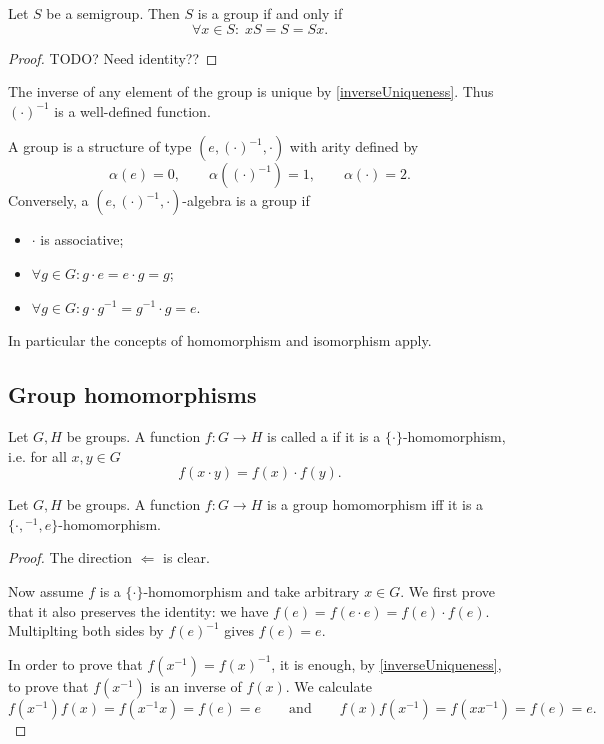 \begin{lemma}
Let $S$ be a semigroup. Then $S$ is a group \textup{if and only if}
\[ \forall x\in S: \; xS = S = Sx. \]
\end{lemma}
\begin{proof}
TODO? Need identity??
\end{proof}

The inverse of any element of the group is unique by \ref{inverseUniqueness}. Thus $(\cdot)^{-1}$ is a well-defined function.

\begin{proposition}
A group is a structure of type $(e, (\cdot)^{-1}, \boldsymbol{\cdot})$ with arity defined by
\[ \alpha(e) = 0, \qquad \alpha((\cdot)^{-1}) = 1, \qquad \alpha(\boldsymbol{\cdot}) = 2. \]
Conversely, a $(e, (\cdot)^{-1}, \boldsymbol{\cdot})$-algebra is a group if
\begin{itemize}
\item $\boldsymbol{\cdot}$ is associative;
\item $\forall g\in G: g\cdot e = e\cdot g = g$;
\item $\forall g\in G: g\cdot g^{-1} = g^{-1}\cdot g = e$.
\end{itemize}
\end{proposition}
In particular the concepts of homomorphism and isomorphism apply.

\subsection{Group homomorphisms}
\begin{definition}
Let $G,H$ be groups. A function $f: G\to H$ is called a  if it is a $\{\cdot\}$-homomorphism, i.e. for all $x,y\in G$
\[ f(x\cdot y) = f(x)\cdot f(y). \]
\end{definition}

\begin{lemma} \label{groupHomomorphismPreservesSignature}
Let $G,H$ be groups. A function $f: G\to H$ is a group homomorphism iff it is a $\{\cdot, {}^{-1}, e\}$-homomorphism.
\end{lemma}
\begin{proof}
The direction $\Leftarrow$ is clear.

Now assume $f$ is a $\{\cdot\}$-homomorphism and take arbitrary $x\in G$. We first prove that it also preserves the identity: we have $f(e) = f(e\cdot e) = f(e)\cdot f(e)$. Multiplting both sides by $f(e)^{-1}$ gives $f(e) = e$.

In order to prove that $f(x^{-1}) = f(x)^{-1}$, it is enough, by \ref{inverseUniqueness}, to prove that $f(x^{-1})$ is an inverse of $f(x)$. We calculate
\[ f(x^{-1})f(x) = f(x^{-1}x) = f(e) = e \qquad\text{and}\qquad f(x)f(x^{-1}) = f(xx^{-1}) = f(e) = e. \]
\end{proof}


